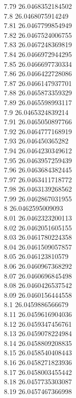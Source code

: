{7.79	26.0468352184502\\
7.8	26.0468075914249\\
7.81	26.0467799854949\\
7.82	26.0467524006755\\
7.83	26.0467248369819\\
7.84	26.0466972944295\\
7.85	26.0466697730334\\
7.86	26.0466422728086\\
7.87	26.0466147937701\\
7.88	26.0465873359329\\
7.89	26.0465598993117\\
7.9	26.0465324839214\\
7.91	26.0465050897766\\
7.92	26.0464777168919\\
7.93	26.046450365282\\
7.94	26.0464230349612\\
7.95	26.0463957259439\\
7.96	26.0463684382445\\
7.97	26.0463411718772\\
7.98	26.0463139268562\\
7.99	26.0462867031955\\
8	26.0462595009093\\
8.01	26.0462323200113\\
8.02	26.0462051605155\\
8.03	26.0461780224358\\
8.04	26.0461509057857\\
8.05	26.046123810579\\
8.06	26.0460967368292\\
8.07	26.0460696845498\\
8.08	26.0460426537542\\
8.09	26.0460156444558\\
8.1	26.0459886566679\\
8.11	26.0459616904036\\
8.12	26.0459347456761\\
8.13	26.0459078224984\\
8.14	26.0458809208835\\
8.15	26.0458540408443\\
8.16	26.0458271823936\\
8.17	26.0458003455442\\
8.18	26.0457735303087\\
8.19	26.0457467366998\\
}
